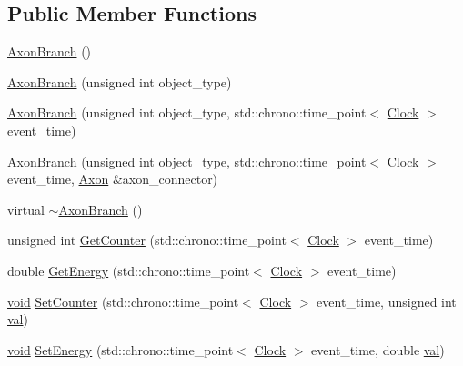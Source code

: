 \subsection*{Public Member Functions}
\begin{DoxyCompactItemize}
\item 
\mbox{\hyperlink{class_axon_branch_a5bb6ccef8d94c937a85148af932221c0}{Axon\+Branch}} ()
\item 
\mbox{\hyperlink{class_axon_branch_a67618605ac3731556ab48a6583e21ba8}{Axon\+Branch}} (unsigned int object\+\_\+type)
\item 
\mbox{\hyperlink{class_axon_branch_ad6191fcfd8bedc058a4f1cfb5056f5b2}{Axon\+Branch}} (unsigned int object\+\_\+type, std\+::chrono\+::time\+\_\+point$<$ \mbox{\hyperlink{universe_8h_a0ef8d951d1ca5ab3cfaf7ab4c7a6fd80}{Clock}} $>$ event\+\_\+time)
\item 
\mbox{\hyperlink{class_axon_branch_a98f33462edf82dacab750d1140172912}{Axon\+Branch}} (unsigned int object\+\_\+type, std\+::chrono\+::time\+\_\+point$<$ \mbox{\hyperlink{universe_8h_a0ef8d951d1ca5ab3cfaf7ab4c7a6fd80}{Clock}} $>$ event\+\_\+time, \mbox{\hyperlink{class_axon}{Axon}} \&axon\+\_\+connector)
\item 
virtual \mbox{\hyperlink{class_axon_branch_ae4ef4c954b43d084cafb30cf900a1728}{$\sim$\+Axon\+Branch}} ()
\item 
unsigned int \mbox{\hyperlink{class_axon_branch_a1d2404b68ec2d18a814c96a7c04c5fc4}{Get\+Counter}} (std\+::chrono\+::time\+\_\+point$<$ \mbox{\hyperlink{universe_8h_a0ef8d951d1ca5ab3cfaf7ab4c7a6fd80}{Clock}} $>$ event\+\_\+time)
\item 
double \mbox{\hyperlink{class_axon_branch_a688ec51cd5116e9aebe9b4d3c5c7f2b1}{Get\+Energy}} (std\+::chrono\+::time\+\_\+point$<$ \mbox{\hyperlink{universe_8h_a0ef8d951d1ca5ab3cfaf7ab4c7a6fd80}{Clock}} $>$ event\+\_\+time)
\item 
\mbox{\hyperlink{glad_8h_a950fc91edb4504f62f1c577bf4727c29}{void}} \mbox{\hyperlink{class_axon_branch_a96ba30b18627563d637d4e02fac943be}{Set\+Counter}} (std\+::chrono\+::time\+\_\+point$<$ \mbox{\hyperlink{universe_8h_a0ef8d951d1ca5ab3cfaf7ab4c7a6fd80}{Clock}} $>$ event\+\_\+time, unsigned int \mbox{\hyperlink{glad_8h_a26942fd2ed566ef553eae82d2c109c8f}{val}})
\item 
\mbox{\hyperlink{glad_8h_a950fc91edb4504f62f1c577bf4727c29}{void}} \mbox{\hyperlink{class_axon_branch_a6918dcaf6d9325a1a22a2e6c65ad5dab}{Set\+Energy}} (std\+::chrono\+::time\+\_\+point$<$ \mbox{\hyperlink{universe_8h_a0ef8d951d1ca5ab3cfaf7ab4c7a6fd80}{Clock}} $>$ event\+\_\+time, double \mbox{\hyperlink{glad_8h_a26942fd2ed566ef553eae82d2c109c8f}{val}})

\end{DoxyCompactItemize}
